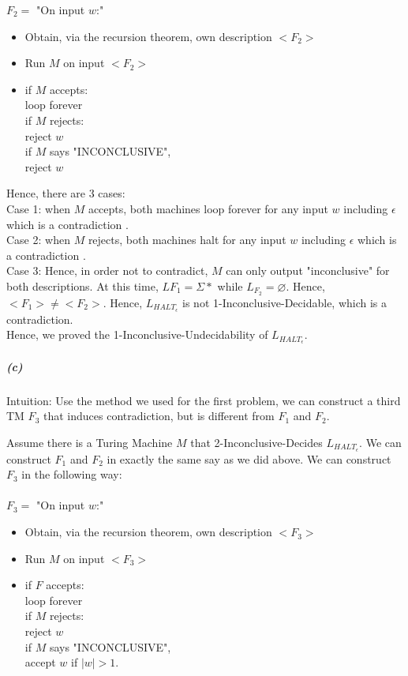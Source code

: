 \documentclass[11pt]{article}
\newcommand\tab[1][1cm]{\hspace*{#1}}
\begin{document}
$F_2=$ "On input $w$:" 
\begin{itemize}
\item Obtain, via the recursion theorem, own description $<F_2>$ 
\item  Run $M$ on input $<F_2>$ 
\item if $M$ accepts: \\
\tab loop forever \\
if $M$ rejects: \\
\tab reject $w$ \\
if $M$ says "INCONCLUSIVE", \\
\tab reject $w$
\end{itemize}

Hence, there are 3 cases: \\

Case 1: when $M$ accepts, both machines loop forever for any input $w$ including $\epsilon$ which is a contradiction .\\

Case 2: when $M$ rejects, both machines halt for any input $w$ including $\epsilon$ which is a contradiction .\\

Case 3: Hence, in order not to contradict, $M$ can only output "inconclusive" for both descriptions. At this time, $L{F_1} = \Sigma*$ while $L_{F_2} = \varnothing$. Hence, $<F_1> \neq <F_2>$. Hence, $L_{{HALT}_{\epsilon}}$ is not 1-Inconclusive-Decidable, which is a contradiction. \\

Hence, we proved the 1-Inconclusive-Undecidability of $L_{{HALT}_{\epsilon}}$.
\newpage

\subparagraph{(c)}
Intuition: Use the method we used for the first problem, we can construct a third TM $F_3$ that induces contradiction, but is different from $F_1$ and $F_2$. 

Assume there is a Turing Machine $M$ that 2-Inconclusive-Decides $L_{{HALT}_{\epsilon}}$. We can construct $F_1$ and $F_2$ in exactly the same say as we did above. We can construct $F_3$ in the following way: \\~\\
$F_3=$ "On input $w$:" 
\begin{itemize}
\item Obtain, via the recursion theorem, own description $<F_3>$ 
\item  Run $M$ on input $<F_3>$ 
\item if $F$ accepts: \\
\tab loop forever \\
if $M$ rejects: \\
\tab reject $w$ \\
if $M$ says "INCONCLUSIVE", \\
\tab accept $w$ if $|w| > 1$. 
\end{itemize}
\end{document}
